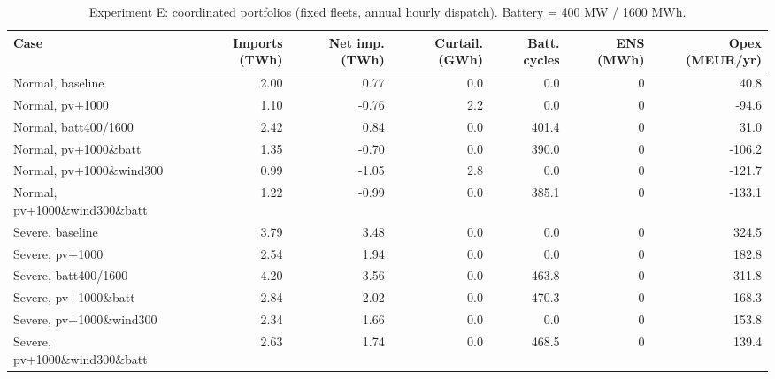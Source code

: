 \begin{table}[htbp]
\centering
\footnotesize
\caption{Experiment E: coordinated portfolios (fixed fleets, annual hourly dispatch). Battery = 400 MW / 1600 MWh.}
\label{tab:exp-E}
\begin{adjustbox}{max width=\linewidth}
\begin{tabular}{lrrrrrr}
\toprule
Case & Imports (TWh) & Net imp. (TWh) & Curtail. (GWh) & Batt. cycles & ENS (MWh) & Opex (MEUR/yr) \\
\midrule
Normal, baseline & 2.00 & 0.77 & 0.0 & 0.0 & 0 & 40.8 \\
Normal, pv+1000 & 1.10 & -0.76 & 2.2 & 0.0 & 0 & -94.6 \\
Normal, batt400/1600 & 2.42 & 0.84 & 0.0 & 401.4 & 0 & 31.0 \\
Normal, pv+1000\&batt & 1.35 & -0.70 & 0.0 & 390.0 & 0 & -106.2 \\
Normal, pv+1000\&wind300 & 0.99 & -1.05 & 2.8 & 0.0 & 0 & -121.7 \\
Normal, pv+1000\&wind300\&batt & 1.22 & -0.99 & 0.0 & 385.1 & 0 & -133.1 \\
Severe, baseline & 3.79 & 3.48 & 0.0 & 0.0 & 0 & 324.5 \\
Severe, pv+1000 & 2.54 & 1.94 & 0.0 & 0.0 & 0 & 182.8 \\
Severe, batt400/1600 & 4.20 & 3.56 & 0.0 & 463.8 & 0 & 311.8 \\
Severe, pv+1000\&batt & 2.84 & 2.02 & 0.0 & 470.3 & 0 & 168.3 \\
Severe, pv+1000\&wind300 & 2.34 & 1.66 & 0.0 & 0.0 & 0 & 153.8 \\
Severe, pv+1000\&wind300\&batt & 2.63 & 1.74 & 0.0 & 468.5 & 0 & 139.4 \\
\bottomrule
\end{tabular}
\end{adjustbox}
\end{table}
